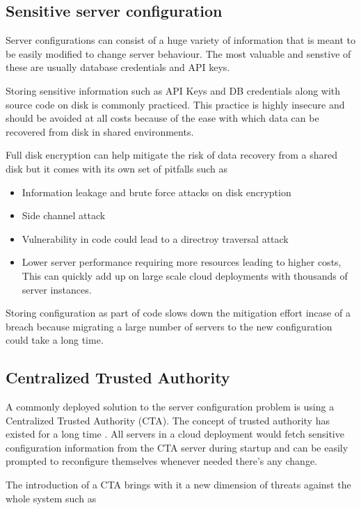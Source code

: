 \documentclass[10pt,conference]{IEEEtran}
\begin{document}
\subsection{Sensitive server configuration}
Server configurations can consist of a huge variety of information that is meant to be easily  
modified to change server behaviour. The most valuable and senstive of these are usually database 
credentials and API keys. 

Storing sensitive information such as API Keys and DB credentials along with source code on disk is 
commonly practiced. This practice is highly insecure and should be avoided at all costs because 
of the ease with which data can be recovered from disk in shared 
environments\cite{jordon_cleaning_2012}.

Full disk encryption can help mitigate the risk of data recovery from a shared disk but it 
comes with its own set of pitfalls such as 

\begin{itemize}
\item Information leakage and brute force attacks on disk encryption
\item Side channel attack\cite{ristenpart_hey_2009}
\item Vulnerability in code could lead to a directroy traversal attack\cite{owasp_path_????}
\item Lower server performance requiring more resources leading to higher costs, This can quickly 
add up on large scale cloud deployments with thousands of server instances.
\end{itemize}

Storing configuration as part of code slows down the mitigation effort incase of a breach because 
migrating a large number of servers to the new configuration could take a long time.

\subsection{Centralized Trusted Authority}
A commonly deployed solution to the server configuration problem is using a Centralized Trusted 
Authority (CTA). The concept of trusted authority has existed for a long time \cite{dan_system_2004}.
All servers in a cloud deployment would fetch sensitive configuration information 
from the CTA server during startup and can be easily prompted to reconfigure themselves whenever 
needed there's any change. 

The introduction of a CTA brings with it a new dimension of threats against the whole system such as 
\end{document}
